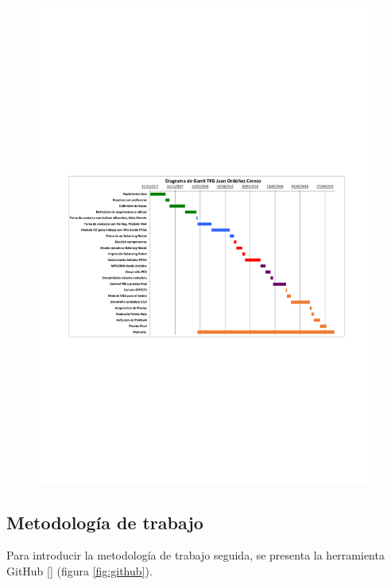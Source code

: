 \begin{center}
	\begin{figure}[H]
		\center
		\includegraphics[trim = 15mm 85mm 0mm 100mm,clip, angle=-90, scale = 1.4]{imagenes/Introduction/Gantt.pdf}
		\label{fig:diagramaGantt}
	\end{figure}
\end{center}

\subsection{Metodología de trabajo}
Para introducir la metodología de trabajo seguida, se presenta la herramienta GitHub [] (figura \ref{fig:github}).\newline 

